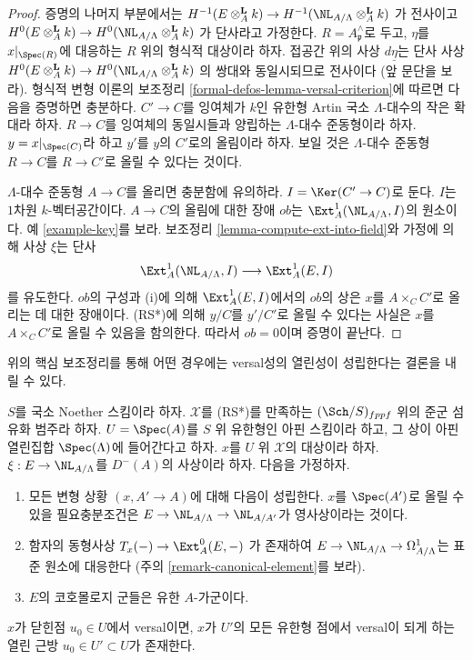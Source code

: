 \begin{proof}
\medskip\noindent
증명의 나머지 부분에서는 $H^{-1}(E \otimes_A^\mathbf{L} k) \to
H^{-1}(\NL_{A/\Lambda} \otimes_A^\mathbf{L} k)$
가 전사이고
$H^0(E \otimes_A^\mathbf{L} k) \to
H^0(\NL_{A/\Lambda} \otimes_A^\mathbf{L} k)$
가 단사라고 가정한다.
$R = A_\mathfrak p^\wedge$로 두고, $\eta$를 $x|_{\Spec(R)}$에 대응하는
$R$ 위의 형식적 대상이라 하자. 접공간 위의 사상 $d\underline{\eta}$는
단사 사상
$H^0(E \otimes_A^{\mathbf{L}} k) \to
H^0(\NL_{A/\Lambda} \otimes_A^{\mathbf{L}} k)$
의 쌍대와 동일시되므로 전사이다 (앞 문단을 보라).
형식적 변형 이론의 보조정리 \ref{formal-defos-lemma-versal-criterion}에
따르면 다음을 증명하면 충분하다.
$C' \to C$를 잉여체가 $k$인 유한형 Artin 국소 $\Lambda$-대수의
작은 확대라 하자. $R \to C$를 잉여체의 동일시들과 양립하는
$\Lambda$-대수 준동형이라 하자.
$y = x|_{\Spec(C)}$라 하고 $y'$를 $y$의 $C'$로의 올림이라 하자.
보일 것은 $\Lambda$-대수 준동형 $R \to C$를 $R \to C'$로 올릴 수
있다는 것이다.

\medskip\noindent
$\Lambda$-대수 준동형 $A \to C$를 올리면 충분함에 유의하라.
$I = \Ker(C' \to C)$로 둔다. $I$는 $1$차원 $k$-벡터공간이다.
$A \to C$의 올림에 대한 장애 $ob$는
$\Ext^1_A(\NL_{A/\Lambda}, I)$의 원소이다. 예 \ref{example-key}를 보라.
보조정리 \ref{lemma-compute-ext-into-field}와 가정에 의해 사상 $\xi$는
단사
$$
\Ext^1_A(\NL_{A/\Lambda}, I)
\longrightarrow
\Ext^1_A(E, I)
$$
를 유도한다. $ob$의 구성과 (i)에 의해 $\Ext^1_A(E, I)$에서의 $ob$의 상은
$x$를 $A \times_C C'$로 올리는 데 대한 장애이다.
(RS*)에 의해 $y/C$를 $y'/C'$로 올릴 수 있다는 사실은 $x$를
$A \times_C C'$로 올릴 수 있음을 함의한다.
따라서 $ob = 0$이며 증명이 끝난다.
\end{proof}

\noindent
위의 핵심 보조정리를 통해 어떤 경우에는 versal성의 열린성이
성립한다는 결론을 내릴 수 있다.

\begin{lemma}
\label{lemma-openness}
$S$를 국소 Noether 스킴이라 하자. $\mathcal{X}$를 (RS*)를 만족하는
$(\Sch/S)_{fppf}$ 위의 준군 섬유화 범주라 하자.
$U = \Spec(A)$를 $S$ 위 유한형인 아핀 스킴이라 하고, 그 상이
아핀 열린집합 $\Spec(\Lambda)$에 들어간다고 하자.
$x$를 $U$ 위 $\mathcal{X}$의 대상이라 하자.
$\xi : E \to \NL_{A/\Lambda}$를 $D^{-}(A)$의 사상이라 하자.
다음을 가정하자.
\begin{enumerate}
\item[(i)] 모든 변형 상황 $(x, A' \to A)$에 대해 다음이 성립한다.
$x$를 $\Spec(A')$로 올릴 수 있을 필요충분조건은
$E \to \NL_{A/\Lambda} \to \NL_{A/A'}$가 영사상이라는 것이다.
\item[(ii)] 함자의 동형사상
$T_x(-) \to \Ext^0_A(E, -)$
가 존재하여 $E \to \NL_{A/\Lambda} \to \Omega^1_{A/\Lambda}$는
표준 원소에 대응한다 (주의 \ref{remark-canonical-element}를 보라).
\item[(iii)] $E$의 코호몰로지 군들은 유한 $A$-가군이다.
\end{enumerate}
$x$가 닫힌점 $u_0 \in U$에서 versal이면, $x$가 $U'$의 모든 유한형
점에서 versal이 되게 하는 열린 근방 $u_0 \in U' \subset U$가 존재한다.
\end{lemma}

